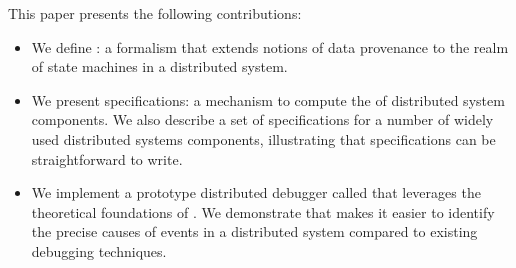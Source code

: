 This paper presents the following contributions:
\begin{itemize}
  \item
    We define \watprovenance{}: a formalism that extends notions of data
    provenance to the realm of state machines in a distributed system.
  \item
    We present \watprovenance{} specifications: a mechanism to compute the
    \watprovenance{} of distributed system components. We also describe a set
    of \watprovenance{} specifications for a number of widely used distributed
    systems components, illustrating that \watprovenance{} specifications can
    be straightforward to write.
  \item
    We implement a prototype distributed debugger called \fluent{} that
    leverages the theoretical foundations of \watprovenance{}. We demonstrate
    that \fluent{} makes it easier to identify the precise causes of events in
    a distributed system compared to existing debugging techniques.
\end{itemize}

